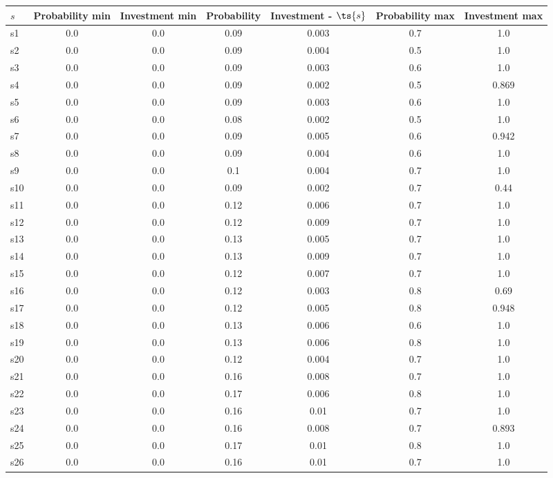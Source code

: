 \documentclass{article}
\begin{document}
\noindent\begin{tabular}{|l|c|c|c|c|c|c|}
\hline
$s$& Probability min & Investment min & Probability & Investment - $\ts{s}$ & Probability max & Investment max\\
\hline
s1 &0.0 & 0.0 & 0.09 & 0.003 & 0.7 & 1.0\\
\hline
s2 &0.0 & 0.0 & 0.09 & 0.004 & 0.5 & 1.0\\
\hline
s3 &0.0 & 0.0 & 0.09 & 0.003 & 0.6 & 1.0\\
\hline
s4 &0.0 & 0.0 & 0.09 & 0.002 & 0.5 & 0.869\\
\hline
s5 &0.0 & 0.0 & 0.09 & 0.003 & 0.6 & 1.0\\
\hline
s6 &0.0 & 0.0 & 0.08 & 0.002 & 0.5 & 1.0\\
\hline
s7 &0.0 & 0.0 & 0.09 & 0.005 & 0.6 & 0.942\\
\hline
s8 &0.0 & 0.0 & 0.09 & 0.004 & 0.6 & 1.0\\
\hline
s9 &0.0 & 0.0 & 0.1 & 0.004 & 0.7 & 1.0\\
\hline
s10 &0.0 & 0.0 & 0.09 & 0.002 & 0.7 & 0.44\\
\hline
s11 &0.0 & 0.0 & 0.12 & 0.006 & 0.7 & 1.0\\
\hline
s12 &0.0 & 0.0 & 0.12 & 0.009 & 0.7 & 1.0\\
\hline
s13 &0.0 & 0.0 & 0.13 & 0.005 & 0.7 & 1.0\\
\hline
s14 &0.0 & 0.0 & 0.13 & 0.009 & 0.7 & 1.0\\
\hline
s15 &0.0 & 0.0 & 0.12 & 0.007 & 0.7 & 1.0\\
\hline
s16 &0.0 & 0.0 & 0.12 & 0.003 & 0.8 & 0.69\\
\hline
s17 &0.0 & 0.0 & 0.12 & 0.005 & 0.8 & 0.948\\
\hline
s18 &0.0 & 0.0 & 0.13 & 0.006 & 0.6 & 1.0\\
\hline
s19 &0.0 & 0.0 & 0.13 & 0.006 & 0.8 & 1.0\\
\hline
s20 &0.0 & 0.0 & 0.12 & 0.004 & 0.7 & 1.0\\
\hline
s21 &0.0 & 0.0 & 0.16 & 0.008 & 0.7 & 1.0\\
\hline
s22 &0.0 & 0.0 & 0.17 & 0.006 & 0.8 & 1.0\\
\hline
s23 &0.0 & 0.0 & 0.16 & 0.01 & 0.7 & 1.0\\
\hline
s24 &0.0 & 0.0 & 0.16 & 0.008 & 0.7 & 0.893\\
\hline
s25 &0.0 & 0.0 & 0.17 & 0.01 & 0.8 & 1.0\\
\hline
s26 &0.0 & 0.0 & 0.16 & 0.01 & 0.7 & 1.0\\

\end{tabular}
\end{document}
